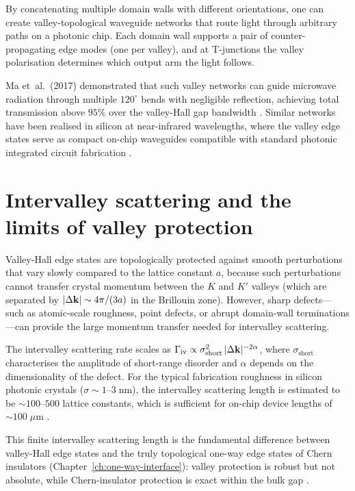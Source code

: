 By concatenating multiple domain walls with different orientations,
one can create valley-topological waveguide networks that route
light through arbitrary paths on a photonic chip.  Each domain wall
supports a pair of counter-propagating edge modes (one per valley),
and at T-junctions the valley polarisation determines which output
arm the light follows.

Ma et~al.\ (2017) demonstrated that such valley networks can guide
microwave radiation through multiple $120^\circ$ bends with
negligible reflection, achieving total transmission above $95\%$
over the valley-Hall gap bandwidth \cite{ma2017scattering}.  Similar
networks have been realised in silicon at near-infrared wavelengths,
where the valley edge states serve as compact on-chip waveguides
compatible with standard photonic integrated circuit fabrication
\cite{he2019silicon,price2022roadmap}.

\section{Intervalley scattering and the limits of valley protection}
\label{sec:ch12-intervalley-limits}

Valley-Hall edge states are topologically protected against smooth
perturbations that vary slowly compared to the lattice constant $a$,
because such perturbations cannot transfer crystal momentum between
the $K$ and $K'$ valleys (which are separated by
$|\Delta\mathbf{k}|\sim 4\pi/(3a)$ in the Brillouin zone).  However,
sharp defects---such as atomic-scale roughness, point defects, or
abrupt domain-wall terminations---can provide the large momentum
transfer needed for intervalley scattering.

The intervalley scattering rate scales as
$\Gamma_{\mathrm{iv}} \propto \sigma_{\mathrm{short}}^2\,
|\Delta\mathbf{k}|^{-2\alpha}$,
where $\sigma_{\mathrm{short}}$ characterises the amplitude of
short-range disorder and $\alpha$ depends on the dimensionality of
the defect.  For the typical fabrication roughness in silicon photonic
crystals ($\sigma \sim 1$--$3\;\mathrm{nm}$), the intervalley
scattering length is estimated to be $\sim 100$--$500$ lattice
constants, which is sufficient for on-chip device lengths of
$\sim 100\;\mu\mathrm{m}$ \cite{he2019silicon,ozawa2018topological}.

This finite intervalley scattering length is the fundamental
difference between valley-Hall edge states and the truly
topological one-way edge states of Chern insulators
(Chapter~\ref{ch:one-way-interface}): valley protection is robust
but not absolute, while Chern-insulator protection is exact within
the bulk gap \cite{price2022roadmap,ma2017scattering}.


